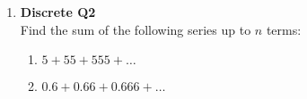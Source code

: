 \documentclass{article}
\begin{document}
\begin{enumerate}
    
    \item \textbf{Discrete Q2}\\
          Find the sum of the following series up to \(n\) terms:
          \begin{enumerate}
              \item \(5 + 55 + 555 + \ldots\)
              \item \(0.6 + 0.66 + 0.666 + \ldots\)
          \end{enumerate}
  \end{enumerate}
  
\end{document}
